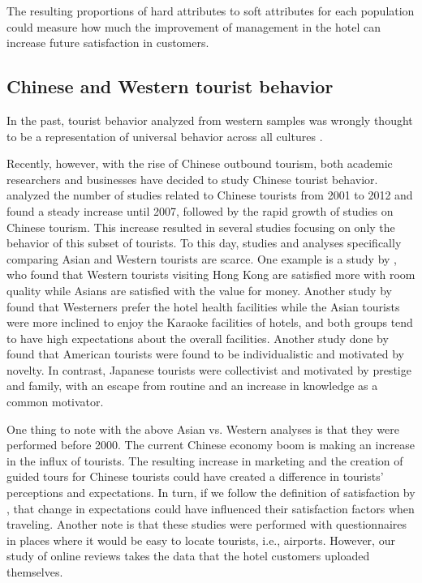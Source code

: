 \documentclass[smallextended,natbib]{svjour3}       %
\begin{document}
    The resulting proportions of hard attributes to soft attributes for each population could measure how much the improvement of management in the hotel can increase future satisfaction in customers.

  \subsection{Chinese and Western tourist behavior}\label{theory_zh_en}

    In the past, tourist behavior analyzed from western samples was wrongly thought to be a representation of universal behavior across all cultures \cite[][]{nielsen2017, henrich2010weirdest, guaratne2009, hogan1978biases}. 

    Recently, however, with the rise of Chinese outbound tourism, both academic researchers and businesses have decided to study Chinese tourist behavior. \cite{sun2017} analyzed the number of studies related to Chinese tourists from 2001 to 2012 and found a steady increase until 2007, followed by the rapid growth of studies on Chinese tourism. This increase resulted in several studies focusing on only the behavior of this subset of tourists. To this day, studies and analyses specifically comparing Asian and Western tourists are scarce. One example is a study by \cite{choi2000}, who found that Western tourists visiting Hong Kong are satisfied more with room quality while Asians are satisfied with the value for money. Another study by \cite{bauer1993changing} found that Westerners prefer the hotel health facilities while the Asian tourists were more inclined to enjoy the Karaoke facilities of hotels, and both groups tend to have high expectations about the overall facilities. Another study done by \cite{kim2000} found that American tourists were found to be individualistic and motivated by novelty. In contrast, Japanese tourists were collectivist and motivated by prestige and family, with an escape from routine and an increase in knowledge as a common motivator. 

    One thing to note with the above Asian vs. Western analyses is that they were performed before 2000. The current Chinese economy boom is making an increase in the influx of tourists. The resulting increase in marketing and the creation of guided tours for Chinese tourists could have created a difference in tourists' perceptions and expectations. In turn, if we follow the definition of satisfaction by \cite{hunt1975}, that change in expectations could have influenced their satisfaction factors when traveling. Another note is that these studies were performed with questionnaires in places where it would be easy to locate tourists, i.e., airports. However, our study of online reviews takes the data that the hotel customers uploaded themselves.
\end{document}
